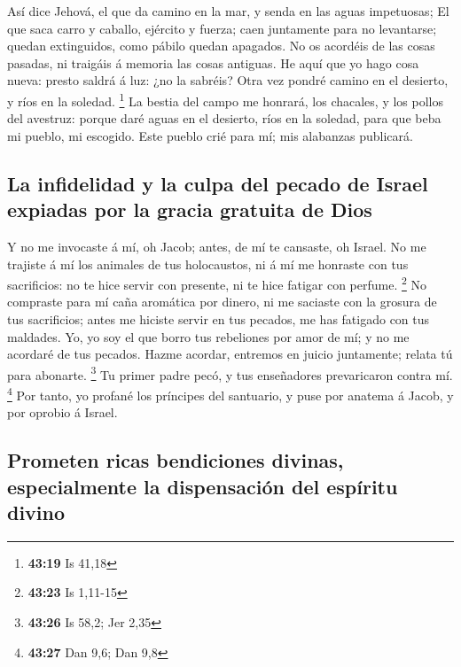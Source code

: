  Así dice Jehová, el que da camino en la mar, y senda en
las aguas impetuosas;  El que saca carro y caballo,
ejército y fuerza; caen juntamente para no levantarse; quedan
extinguidos, como pábilo quedan apagados.  No os acordéis
de las cosas pasadas, ni traigáis á memoria las cosas antiguas.
 He aquí que yo hago cosa nueva: presto saldrá á luz: ¿no
la sabréis? Otra vez pondré camino en el desierto, y ríos en la soledad.
\footnote{\textbf{43:19} Is 41,18}  La bestia del campo me
honrará, los chacales, y los pollos del avestruz: porque daré aguas en
el desierto, ríos en la soledad, para que beba mi pueblo, mi escogido.
 Este pueblo crié para mí; mis alabanzas publicará.

\hypertarget{la-infidelidad-y-la-culpa-del-pecado-de-israel-expiadas-por-la-gracia-gratuita-de-dios}{%
\subsection{La infidelidad y la culpa del pecado de Israel expiadas por
la gracia gratuita de
Dios}\label{la-infidelidad-y-la-culpa-del-pecado-de-israel-expiadas-por-la-gracia-gratuita-de-dios}}

 Y no me invocaste á mí, oh Jacob; antes, de mí te
cansaste, oh Israel.  No me trajiste á mí los animales de
tus holocaustos, ni á mí me honraste con tus sacrificios: no te hice
servir con presente, ni te hice fatigar con perfume. \footnote{\textbf{43:23}
  Is 1,11-15}  No compraste para mí caña aromática por
dinero, ni me saciaste con la grosura de tus sacrificios; antes me
hiciste servir en tus pecados, me has fatigado con tus maldades.
 Yo, yo soy el que borro tus rebeliones por amor de mí; y
no me acordaré de tus pecados.  Hazme acordar, entremos en
juicio juntamente; relata tú para abonarte. \footnote{\textbf{43:26} Is
  58,2; Jer 2,35}  Tu primer padre pecó, y tus enseñadores
prevaricaron contra mí. \footnote{\textbf{43:27} Dan 9,6; Dan 9,8}
 Por tanto, yo profané los príncipes del santuario, y puse
por anatema á Jacob, y por oprobio á Israel.

\hypertarget{prometen-ricas-bendiciones-divinas-especialmente-la-dispensaciuxf3n-del-espuxedritu-divino}{%
\subsection{Prometen ricas bendiciones divinas, especialmente la
dispensación del espíritu
divino}\label{prometen-ricas-bendiciones-divinas-especialmente-la-dispensaciuxf3n-del-espuxedritu-divino}}

